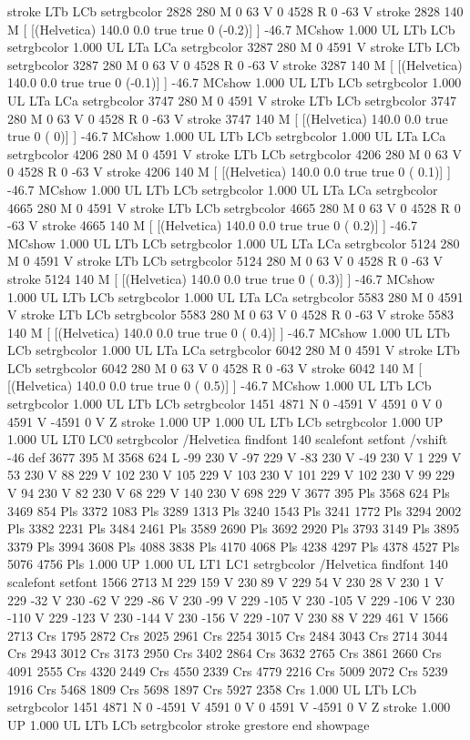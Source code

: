 stroke
LTb
LCb setrgbcolor
2828 280 M
0 63 V
0 4528 R
0 -63 V
stroke
2828 140 M
[ [(Helvetica) 140.0 0.0 true true 0 (-0.2)]
] -46.7 MCshow
1.000 UL
LTb
LCb setrgbcolor
1.000 UL
LTa
LCa setrgbcolor
3287 280 M
0 4591 V
stroke
LTb
LCb setrgbcolor
3287 280 M
0 63 V
0 4528 R
0 -63 V
stroke
3287 140 M
[ [(Helvetica) 140.0 0.0 true true 0 (-0.1)]
] -46.7 MCshow
1.000 UL
LTb
LCb setrgbcolor
1.000 UL
LTa
LCa setrgbcolor
3747 280 M
0 4591 V
stroke
LTb
LCb setrgbcolor
3747 280 M
0 63 V
0 4528 R
0 -63 V
stroke
3747 140 M
[ [(Helvetica) 140.0 0.0 true true 0 ( 0)]
] -46.7 MCshow
1.000 UL
LTb
LCb setrgbcolor
1.000 UL
LTa
LCa setrgbcolor
4206 280 M
0 4591 V
stroke
LTb
LCb setrgbcolor
4206 280 M
0 63 V
0 4528 R
0 -63 V
stroke
4206 140 M
[ [(Helvetica) 140.0 0.0 true true 0 ( 0.1)]
] -46.7 MCshow
1.000 UL
LTb
LCb setrgbcolor
1.000 UL
LTa
LCa setrgbcolor
4665 280 M
0 4591 V
stroke
LTb
LCb setrgbcolor
4665 280 M
0 63 V
0 4528 R
0 -63 V
stroke
4665 140 M
[ [(Helvetica) 140.0 0.0 true true 0 ( 0.2)]
] -46.7 MCshow
1.000 UL
LTb
LCb setrgbcolor
1.000 UL
LTa
LCa setrgbcolor
5124 280 M
0 4591 V
stroke
LTb
LCb setrgbcolor
5124 280 M
0 63 V
0 4528 R
0 -63 V
stroke
5124 140 M
[ [(Helvetica) 140.0 0.0 true true 0 ( 0.3)]
] -46.7 MCshow
1.000 UL
LTb
LCb setrgbcolor
1.000 UL
LTa
LCa setrgbcolor
5583 280 M
0 4591 V
stroke
LTb
LCb setrgbcolor
5583 280 M
0 63 V
0 4528 R
0 -63 V
stroke
5583 140 M
[ [(Helvetica) 140.0 0.0 true true 0 ( 0.4)]
] -46.7 MCshow
1.000 UL
LTb
LCb setrgbcolor
1.000 UL
LTa
LCa setrgbcolor
6042 280 M
0 4591 V
stroke
LTb
LCb setrgbcolor
6042 280 M
0 63 V
0 4528 R
0 -63 V
stroke
6042 140 M
[ [(Helvetica) 140.0 0.0 true true 0 ( 0.5)]
] -46.7 MCshow
1.000 UL
LTb
LCb setrgbcolor
1.000 UL
LTb
LCb setrgbcolor
1451 4871 N
0 -4591 V
4591 0 V
0 4591 V
-4591 0 V
Z stroke
1.000 UP
1.000 UL
LTb
LCb setrgbcolor
1.000 UP
1.000 UL
LT0
LC0 setrgbcolor
/Helvetica findfont 140 scalefont setfont
/vshift -46 def
3677 395 M
3568 624 L
-99 230 V
-97 229 V
-83 230 V
-49 230 V
1 229 V
53 230 V
88 229 V
102 230 V
105 229 V
103 230 V
101 229 V
102 230 V
99 229 V
94 230 V
82 230 V
68 229 V
140 230 V
698 229 V
3677 395 Pls
3568 624 Pls
3469 854 Pls
3372 1083 Pls
3289 1313 Pls
3240 1543 Pls
3241 1772 Pls
3294 2002 Pls
3382 2231 Pls
3484 2461 Pls
3589 2690 Pls
3692 2920 Pls
3793 3149 Pls
3895 3379 Pls
3994 3608 Pls
4088 3838 Pls
4170 4068 Pls
4238 4297 Pls
4378 4527 Pls
5076 4756 Pls
1.000 UP
1.000 UL
LT1
LC1 setrgbcolor
/Helvetica findfont 140 scalefont setfont
1566 2713 M
229 159 V
230 89 V
229 54 V
230 28 V
230 1 V
229 -32 V
230 -62 V
229 -86 V
230 -99 V
229 -105 V
230 -105 V
229 -106 V
230 -110 V
229 -123 V
230 -144 V
230 -156 V
229 -107 V
230 88 V
229 461 V
1566 2713 Crs
1795 2872 Crs
2025 2961 Crs
2254 3015 Crs
2484 3043 Crs
2714 3044 Crs
2943 3012 Crs
3173 2950 Crs
3402 2864 Crs
3632 2765 Crs
3861 2660 Crs
4091 2555 Crs
4320 2449 Crs
4550 2339 Crs
4779 2216 Crs
5009 2072 Crs
5239 1916 Crs
5468 1809 Crs
5698 1897 Crs
5927 2358 Crs
1.000 UL
LTb
LCb setrgbcolor
1451 4871 N
0 -4591 V
4591 0 V
0 4591 V
-4591 0 V
Z stroke
1.000 UP
1.000 UL
LTb
LCb setrgbcolor
stroke
grestore
end
showpage

